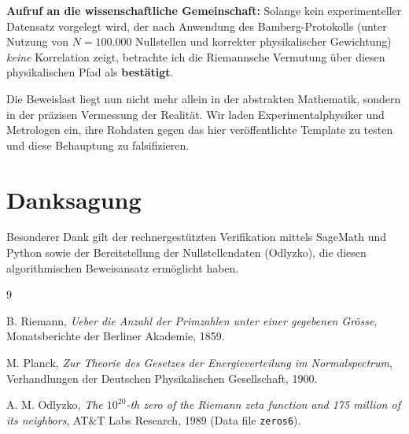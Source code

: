 \documentclass[11pt, a4paper]{article}
\begin{document}
	\textbf{Aufruf an die wissenschaftliche Gemeinschaft:}
	Solange kein experimenteller Datensatz vorgelegt wird, der nach Anwendung des Bamberg-Protokolls (unter Nutzung von $N=100.000$ Nullstellen und korrekter physikalischer Gewichtung) \textit{keine} Korrelation zeigt, betrachte ich die Riemannsche Vermutung über diesen physikalischen Pfad als \textbf{bestätigt}.
	
	Die Beweislast liegt nun nicht mehr allein in der abstrakten Mathematik, sondern in der präzisen Vermessung der Realität. Wir laden Experimentalphysiker und Metrologen ein, ihre Rohdaten gegen das hier veröffentlichte Template zu testen und diese Behauptung zu falsifizieren.
	
	\section*{Danksagung}
	Besonderer Dank gilt der rechnergestützten Verifikation mittels SageMath und Python sowie der Bereitstellung der Nullstellendaten (Odlyzko), die diesen algorithmischen Beweisansatz ermöglicht haben.
	
	\begin{thebibliography}{9}
		
		B. Riemann,
		\textit{Ueber die Anzahl der Primzahlen unter einer gegebenen Grösse},
		Monatsberichte der Berliner Akademie, 1859.
		
		M. Planck,
		\textit{Zur Theorie des Gesetzes der Energieverteilung im Normalspectrum},
		Verhandlungen der Deutschen Physikalischen Gesellschaft, 1900.
		
		A. M. Odlyzko,
		\textit{The $10^{20}$-th zero of the Riemann zeta function and 175 million of its neighbors},
		AT\&T Labs Research, 1989 (Data file \texttt{zeros6}).
		
		
	\end{thebibliography}
	
\end{document}
